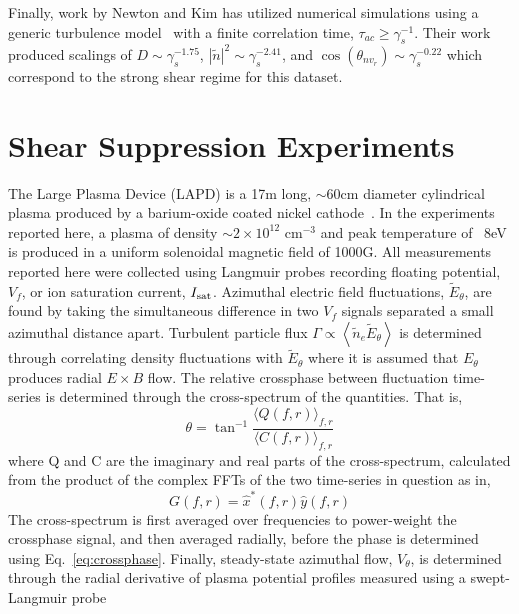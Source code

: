 \documentclass[aip,pop,amsmath,amssymb,preprint,superscriptaddress]{revtex4-1} %
\begin{document}
Finally, work by Newton and Kim has utilized numerical simulations
using a generic turbulence model~\cite{newton11} with a finite
correlation time, $\tau_{ac} \geq \gamma_{s}^{-1}$. Their work produced scalings of $D \sim \gamma_{s}^{-1.75}$, $|\tilde{n}|^{2} \sim \gamma_{s}^{-2.41}$, and $\cos(\theta_{nv_{r}}) \sim \gamma_{s}^{-0.22}$ which correspond to the strong shear regime for this dataset.

\section{Shear Suppression Experiments}

The Large Plasma Device (LAPD) is a 17m long, $\sim$60cm diameter cylindrical plasma produced by a barium-oxide coated nickel cathode~\cite{gek91}. In the experiments reported here, a plasma of density $\sim$$2 \times 10^{12}$ cm$^{-3}$ and peak temperature of ~8eV is produced in a uniform solenoidal magnetic field of 1000G. All measurements reported here were collected using Langmuir probes recording floating potential, $V_{f}$, or ion saturation current, $I_{\rm sat}$. Azimuthal electric field fluctuations, $\tilde{E}_{\theta}$, are found by taking the simultaneous difference in two $V_{f}$ signals separated a small azimuthal distance apart. Turbulent particle flux $\Gamma \propto \left<\tilde{n}_e \tilde{E}_\theta\right>$ is determined through correlating density fluctuations with $\tilde{E}_{\theta}$ where it is assumed that $E_{\theta}$ produces radial $E \times B$ flow. The relative crossphase between fluctuation time-series is determined through the cross-spectrum of the quantities. That is,
%
\begin{equation}
\theta = \tan^{-1}\frac{\langle Q(f,r)\rangle_{f,r}}{\langle C(f,r)\rangle_{f,r}}
\label{eq:crossphase}
\end{equation}
%
where Q and C are the imaginary and real parts of the cross-spectrum, calculated from the product of the complex FFTs of the two time-series in question as in,
\begin{equation}
G(f,r) = \hat{x}^{\ast}(f,r)\hat{y}(f,r)
\label{eq:crossspectrum}
\end{equation}
%
The cross-spectrum is first averaged over frequencies to power-weight
the crossphase signal, and then averaged radially, before the phase is
determined using Eq.~\ref{eq:crossphase}. Finally, steady-state azimuthal
flow, $V_{\theta}$, is determined through the radial derivative of
plasma potential profiles measured using a swept-Langmuir probe
$$
\end{document}
